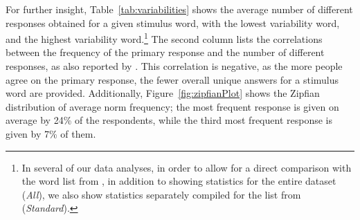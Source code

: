 \documentclass[11pt,letterpaper]{article}
\newcommand{\tabref}[1]{Table~\ref{#1}} %
\newcommand{\figref}[1]{Figure~\ref{#1}} %
\begin{document}



For further insight, \tabref{tab:variabilities} shows the average number of different responses obtained for a given stimulus word, with the lowest variability word, and the highest variability word.\footnote{In several of our data analyses, in order to allow for a direct comparison with the word list from \cite{Kent10}, in addition to showing statistics for the entire dataset ({\it All}), we also show statistics separately compiled for the list from \cite{Kent10} ({\it Standard}).} The second column lists the correlations between the frequency of the primary response and the number of different responses, as also reported by \cite{Jenkins1965}. This correlation is negative, as the more people agree on the primary response, the fewer overall unique answers for a stimulus word are provided. Additionally, \figref{fig:zipfianPlot} shows the Zipfian distribution of average norm frequency; the most frequent response is given on average by 24\% of the respondents, while the third most frequent response is given by 7\% of them.
\end{document}
